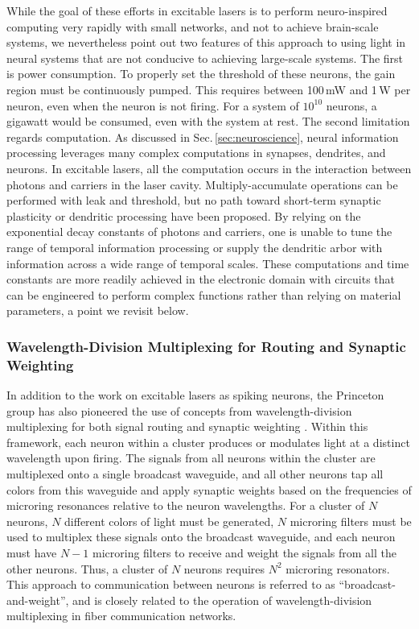 While the goal of these efforts in excitable lasers is to perform neuro-inspired computing very rapidly with small networks, and not to achieve brain-scale systems, we nevertheless point out two features of this approach to using light in neural systems that are not conducive to achieving large-scale systems. The first is power consumption. To properly set the threshold of these neurons, the gain region must be continuously pumped. This requires between 100\,mW and 1\,W per neuron, even when the neuron is not firing. For a system of $10^{10}$ neurons, a gigawatt would be consumed, even with the system at rest. The second limitation regards computation. As discussed in Sec.\,\ref{sec:neuroscience}, neural information processing leverages many complex computations in synapses, dendrites, and neurons. In excitable lasers, all the computation occurs in the interaction between photons and carriers in the laser cavity. Multiply-accumulate operations can be performed with leak and threshold, but no path toward short-term synaptic plasticity or dendritic processing have been proposed. By relying on the exponential decay constants of photons and carriers, one is unable to tune the range of temporal information processing or supply the dendritic arbor with information across a wide range of temporal scales. These computations and time constants are more readily achieved in the electronic domain with circuits that can be engineered to perform complex functions rather than relying on material parameters, a point we revisit below.

\subsubsection{Wavelength-Division Multiplexing for Routing and Synaptic Weighting} 
In addition to the work on excitable lasers as spiking neurons, the Princeton group has also pioneered the use of concepts from wavelength-division multiplexing for both signal routing and synaptic weighting \cite{tana20142,tafe2017}. Within this framework, each neuron within a cluster produces or modulates light at a distinct wavelength upon firing. The signals from all neurons within the cluster are multiplexed onto a single broadcast waveguide, and all other neurons tap all colors from this waveguide and apply synaptic weights based on the frequencies of microring resonances relative to the neuron wavelengths. For a cluster of $N$ neurons, $N$ different colors of light must be generated, $N$ microring filters must be used to multiplex these signals onto the broadcast waveguide, and each neuron must have $N-1$ microring filters to receive and weight the signals from all the other neurons. Thus, a cluster of $N$ neurons requires $N^2$ microring resonators. This approach to communication between neurons is referred to as ``broadcast-and-weight'', and is closely related to the operation of wavelength-division multiplexing in fiber communication networks.

